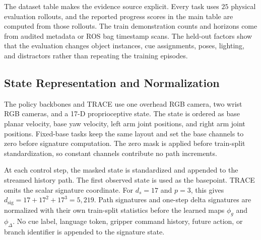\documentclass{article}
\begin{document}
The dataset table makes the evidence source explicit. Every task uses $25$ physical evaluation rollouts, and the reported progress scores in the main table are computed from those rollouts. The train demonstration counts and horizons come from audited metadata or ROS bag timestamp scans. The held-out factors show that the evaluation changes object instances, cue assignments, poses, lighting, and distractors rather than repeating the training episodes.

\subsection{State Representation and Normalization}
\label{app:state_representation}
\label{app:state_hparams}

The policy backbones and TRACE use one overhead RGB camera, two wrist RGB cameras, and a 17-D proprioceptive state. The state is ordered as base planar velocity, base yaw velocity, left arm joint positions, and right arm joint positions. Fixed-base tasks keep the same layout and set the base channels to zero before signature computation. The zero mask is applied before train-split standardization, so constant channels contribute no path increments.

At each control step, the masked state is standardized and appended to the streamed history path. The first observed state is used as the basepoint. TRACE omits the scalar signature coordinate. For $d_s{=}17$ and $p{=}3$, this gives $d_{\mathrm{sig}}=17+17^2+17^3=5{,}219$. Path signatures and one-step delta signatures are normalized with their own train-split statistics before the learned maps $\phi_g$ and $\phi_\Delta$. No cue label, language token, gripper command history, future action, or branch identifier is appended to the signature state.
\end{document}

